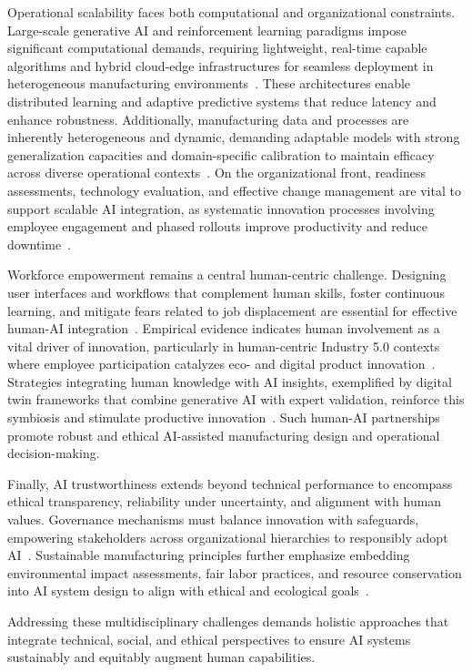 \documentclass[sigconf]{acmart}
\begin{document}
Operational scalability faces both computational and organizational constraints. Large-scale generative AI and reinforcement learning paradigms impose significant computational demands, requiring lightweight, real-time capable algorithms and hybrid cloud-edge infrastructures for seamless deployment in heterogeneous manufacturing environments~\cite{ref19,ref37}. These architectures enable distributed learning and adaptive predictive systems that reduce latency and enhance robustness. Additionally, manufacturing data and processes are inherently heterogeneous and dynamic, demanding adaptable models with strong generalization capacities and domain-specific calibration to maintain efficacy across diverse operational contexts~\cite{ref7,ref29}. On the organizational front, readiness assessments, technology evaluation, and effective change management are vital to support scalable AI integration, as systematic innovation processes involving employee engagement and phased rollouts improve productivity and reduce downtime~\cite{ref19}.

Workforce empowerment remains a central human-centric challenge. Designing user interfaces and workflows that complement human skills, foster continuous learning, and mitigate fears related to job displacement are essential for effective human-AI integration~\cite{ref2,ref22}. Empirical evidence indicates human involvement as a vital driver of innovation, particularly in human-centric Industry 5.0 contexts where employee participation catalyzes eco- and digital product innovation~\cite{ref22}. Strategies integrating human knowledge with AI insights, exemplified by digital twin frameworks that combine generative AI with expert validation, reinforce this symbiosis and stimulate productive innovation~\cite{ref2}. Such human-AI partnerships promote robust and ethical AI-assisted manufacturing design and operational decision-making.

Finally, AI trustworthiness extends beyond technical performance to encompass ethical transparency, reliability under uncertainty, and alignment with human values. Governance mechanisms must balance innovation with safeguards, empowering stakeholders across organizational hierarchies to responsibly adopt AI~\cite{ref41}. Sustainable manufacturing principles further emphasize embedding environmental impact assessments, fair labor practices, and resource conservation into AI system design to align with ethical and ecological goals~\cite{ref41}.

Addressing these multidisciplinary challenges demands holistic approaches that integrate technical, social, and ethical perspectives to ensure AI systems sustainably and equitably augment human capabilities.
\end{document}
